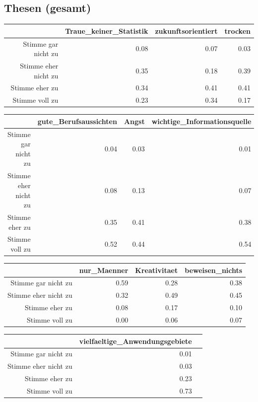 \documentclass[12pt,a4paper,titlepage=true,parskip,ngerman]{scrartcl}
\begin{document}
\subsection{Thesen (gesamt)}
  \begin{table}[ht]
 
\begin{tabular}{rrrr}
  \hline
 & Traue\_keiner\_Statistik & zukunftsorientiert & trocken \\ 
  \hline
Stimme gar nicht zu & 0.08 & 0.07 & 0.03 \\ 
  Stimme eher nicht zu & 0.35 & 0.18 & 0.39 \\ 
  Stimme eher zu & 0.34 & 0.41 & 0.41 \\ 
  Stimme voll zu & 0.23 & 0.34 & 0.17 \\ 
   \hline
\end{tabular}

\bigskip

\begin{tabular}{rrrr}
  \hline
 & gute\_Berufsaussichten & Angst & wichtige\_Informationsquelle \\ 
  \hline
Stimme gar nicht zu & 0.04 & 0.03 & 0.01 \\ 
  Stimme eher nicht zu & 0.08 & 0.13 & 0.07 \\ 
  Stimme eher zu & 0.35 & 0.41 & 0.38 \\ 
  Stimme voll zu & 0.52 & 0.44 & 0.54 \\ 
   \hline
\end{tabular}

\bigskip 

\begin{tabular}{rrrr}
  \hline
 & nur\_Maenner & Kreativitaet & beweisen\_nichts \\ 
  \hline
Stimme gar nicht zu & 0.59 & 0.28 & 0.38 \\ 
  Stimme eher nicht zu & 0.32 & 0.49 & 0.45 \\ 
  Stimme eher zu & 0.08 & 0.17 & 0.10 \\ 
  Stimme voll zu & 0.00 & 0.06 & 0.07 \\ 
   \hline
\end{tabular}

\bigskip

\begin{tabular}{rrr}
  \hline
 & vielfaeltige\_Anwendungsgebiete \\ 
  \hline
Stimme gar nicht zu & 0.01 \\ 
  Stimme eher nicht zu & 0.03 \\ 
  Stimme eher zu & 0.23 \\ 
  Stimme voll zu & 0.73 \\ 
   \hline
\end{tabular}
\end{table}
\newpage
\end{document}
